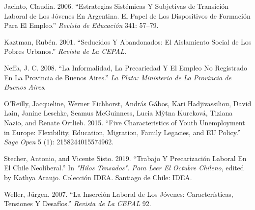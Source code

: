 \documentclass[]{article}
\begin{document}
\leavevmode\hypertarget{ref-jacinto_estrategias_2006}{}%
Jacinto, Claudia. 2006. ``Estrategias Sistémicas Y Subjetivas de
Transición Laboral de Los Jóvenes En Argentina. El Papel de Los
Dispositivos de Formación Para El Empleo.'' \emph{Revista de Educación}
341: 57--79.

\leavevmode\hypertarget{ref-kaztman_seducidos_2001}{}%
Kaztman, Rubén. 2001. ``Seducidos Y Abandonados: El Aislamiento Social
de Los Pobres Urbanos.'' \emph{Revista de La CEPAL}.

\leavevmode\hypertarget{ref-neffa_informalidad_2008}{}%
Neffa, J. C. 2008. ``La Informalidad, La Precariedad Y El Empleo No
Registrado En La Provincia de Buenos Aires.'' \emph{La Plata: Ministerio
de La Provincia de Buenos Aires}.

\leavevmode\hypertarget{ref-oreilly_five_2015}{}%
O'Reilly, Jacqueline, Werner Eichhorst, András Gábos, Kari
Hadjivassiliou, David Lain, Janine Leschke, Seamus McGuinness, Lucia
Mỳtna Kureková, Tiziana Nazio, and Renate Ortlieb. 2015. ``Five
Characteristics of Youth Unemployment in Europe: Flexibility, Education,
Migration, Family Legacies, and EU Policy.'' \emph{Sage Open} 5 (1):
2158244015574962.

\leavevmode\hypertarget{ref-stecher_trabajo_2019}{}%
Stecher, Antonio, and Vicente Sisto. 2019. ``Trabajo Y Precarización
Laboral En El Chile Neoliberal.'' In \emph{"Hilos Tensados". Para Leer
El Octubre Chileno}, edited by Kathya Araujo. Colección IDEA. Santiago
de Chile: IDEA.

\leavevmode\hypertarget{ref-weller_insercion_2007}{}%
Weller, Jürgen. 2007. ``La Inserción Laboral de Los Jóvenes:
Características, Tensiones Y Desafíos.'' \emph{Revista de La CEPAL} 92.
\end{document}

